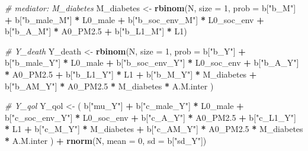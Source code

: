 \documentclass[
]{book}
\newenvironment{Shaded}{\begin{snugshade}}{\end{snugshade}}
\newcommand{\AttributeTok}[1]{\textcolor[rgb]{0.13,0.29,0.53}{#1}}
\newcommand{\CommentTok}[1]{\textcolor[rgb]{0.56,0.35,0.01}{\textit{#1}}}
\newcommand{\DecValTok}[1]{\textcolor[rgb]{0.00,0.00,0.81}{#1}}
\newcommand{\FloatTok}[1]{\textcolor[rgb]{0.00,0.00,0.81}{#1}}
\newcommand{\FunctionTok}[1]{\textcolor[rgb]{0.13,0.29,0.53}{\textbf{#1}}}
\newcommand{\NormalTok}[1]{#1}
\newcommand{\OtherTok}[1]{\textcolor[rgb]{0.56,0.35,0.01}{#1}}
\newcommand{\SpecialCharTok}[1]{\textcolor[rgb]{0.81,0.36,0.00}{\textbf{#1}}}
\newcommand{\StringTok}[1]{\textcolor[rgb]{0.31,0.60,0.02}{#1}}
\begin{document}
\begin{Shaded}
\begin{Highlighting}[]
  \CommentTok{\# mediator: M\_diabetes}
\NormalTok{  M\_diabetes }\OtherTok{\textless{}{-}} \FunctionTok{rbinom}\NormalTok{(N, }\AttributeTok{size =} \DecValTok{1}\NormalTok{, }\AttributeTok{prob =}\NormalTok{ b[}\StringTok{"b\_M"}\NormalTok{] }\SpecialCharTok{+} 
\NormalTok{                        b[}\StringTok{"b\_male\_M"}\NormalTok{] }\SpecialCharTok{*}\NormalTok{ L0\_male }\SpecialCharTok{+} 
\NormalTok{                        b[}\StringTok{"b\_soc\_env\_M"}\NormalTok{] }\SpecialCharTok{*}\NormalTok{ L0\_soc\_env }\SpecialCharTok{+} 
\NormalTok{                        b[}\StringTok{"b\_A\_M"}\NormalTok{] }\SpecialCharTok{*}\NormalTok{ A0\_PM2}\FloatTok{.5} \SpecialCharTok{+}
\NormalTok{                        b[}\StringTok{"b\_L1\_M"}\NormalTok{] }\SpecialCharTok{*}\NormalTok{ L1) }

  \CommentTok{\# Y\_death }
\NormalTok{  Y\_death }\OtherTok{\textless{}{-}} \FunctionTok{rbinom}\NormalTok{(N, }\AttributeTok{size =} \DecValTok{1}\NormalTok{, }\AttributeTok{prob =}\NormalTok{ b[}\StringTok{"b\_Y"}\NormalTok{] }\SpecialCharTok{+} 
\NormalTok{                      b[}\StringTok{"b\_male\_Y"}\NormalTok{] }\SpecialCharTok{*}\NormalTok{ L0\_male }\SpecialCharTok{+} 
\NormalTok{                      b[}\StringTok{"b\_soc\_env\_Y"}\NormalTok{] }\SpecialCharTok{*}\NormalTok{ L0\_soc\_env }\SpecialCharTok{+} 
\NormalTok{                      b[}\StringTok{"b\_A\_Y"}\NormalTok{] }\SpecialCharTok{*}\NormalTok{ A0\_PM2}\FloatTok{.5} \SpecialCharTok{+} 
\NormalTok{                      b[}\StringTok{"b\_L1\_Y"}\NormalTok{] }\SpecialCharTok{*}\NormalTok{ L1 }\SpecialCharTok{+}
\NormalTok{                      b[}\StringTok{"b\_M\_Y"}\NormalTok{] }\SpecialCharTok{*}\NormalTok{ M\_diabetes }\SpecialCharTok{+}
\NormalTok{                      b[}\StringTok{"b\_AM\_Y"}\NormalTok{] }\SpecialCharTok{*}\NormalTok{ A0\_PM2}\FloatTok{.5} \SpecialCharTok{*}\NormalTok{ M\_diabetes }\SpecialCharTok{*}\NormalTok{ A.M.inter ) }
  
  \CommentTok{\# Y\_qol }
\NormalTok{  Y\_qol }\OtherTok{\textless{}{-}}\NormalTok{ ( b[}\StringTok{"mu\_Y"}\NormalTok{] }\SpecialCharTok{+} 
\NormalTok{               b[}\StringTok{"c\_male\_Y"}\NormalTok{] }\SpecialCharTok{*}\NormalTok{ L0\_male }\SpecialCharTok{+} 
\NormalTok{               b[}\StringTok{"c\_soc\_env\_Y"}\NormalTok{] }\SpecialCharTok{*}\NormalTok{ L0\_soc\_env }\SpecialCharTok{+}
\NormalTok{               b[}\StringTok{"c\_A\_Y"}\NormalTok{] }\SpecialCharTok{*}\NormalTok{ A0\_PM2}\FloatTok{.5} \SpecialCharTok{+}
\NormalTok{               b[}\StringTok{"c\_L1\_Y"}\NormalTok{] }\SpecialCharTok{*}\NormalTok{ L1 }\SpecialCharTok{+}
\NormalTok{               b[}\StringTok{"c\_M\_Y"}\NormalTok{] }\SpecialCharTok{*}\NormalTok{ M\_diabetes }\SpecialCharTok{+} 
\NormalTok{               b[}\StringTok{"c\_AM\_Y"}\NormalTok{] }\SpecialCharTok{*}\NormalTok{ A0\_PM2}\FloatTok{.5} \SpecialCharTok{*}\NormalTok{ M\_diabetes }\SpecialCharTok{*}\NormalTok{ A.M.inter ) }\SpecialCharTok{+} 
    \FunctionTok{rnorm}\NormalTok{(N, }\AttributeTok{mean =} \DecValTok{0}\NormalTok{, }\AttributeTok{sd =}\NormalTok{ b[}\StringTok{"sd\_Y"}\NormalTok{])}
  

\end{Highlighting}
\end{Shaded}
\end{document}

